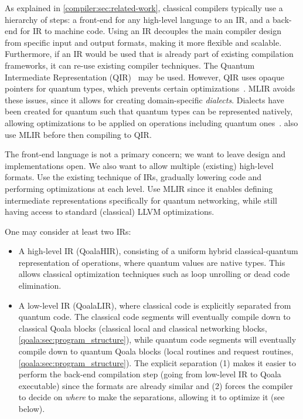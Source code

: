 As explained in \cref{compiler:sec:related-work}, classical compilers typically use a hierarchy of steps: a front-end for any high-level language to an \acf{IR}, and a back-end for \ac{IR} to machine code.
Using an \ac{IR} decouples the main compiler design from specific input and output formats, making it more flexible and scalable.
Furthermore, if an \ac{IR} would be used that is already part of existing compilation frameworks, it can re-use existing compiler techniques.
The Quantum Intermediate Representation (QIR)~\cite{haner_software_2018, geller_introducing_2020} may be used.
However, QIR uses opaque pointers for quantum types, which prevents certain optimizations~\cite{ittah_enabling_2022, peduri_qssa_2022}.
\acf{MLIR} avoids these issues, since it allows for creating domain-specific \emph{dialects}.
Dialects have been created for quantum such that quantum types can be represented natively, allowing optimizations to be applied on operations including quantum ones~\cite{ittah_enabling_2022, peduri_qssa_2022}.
\cite{mccaskey_mlir_2021, nguyen_retargetable_2022} also use \ac{MLIR} before then compiling to QIR.


The front-end language is not a primary concern; we want to leave design and implementations open.
We also want to allow multiple (existing) high-level formats.
Use the existing technique of IRs, gradually lowering code and performing optimizations at each level.
Use \ac{MLIR} since it enables defining intermediate representations specifically for quantum networking, while still having access to standard (classical) LLVM optimizations.

One may consider at least two \ac{IR}s:
\begin{itemize}
  \item A high-level \ac{IR} (QoalaHIR), consisting of a uniform hybrid classical-quantum representation of operations, where quantum values are native types.
  This allows classical optimization techniques such as loop unrolling or dead code elimination.
  \item A low-level \ac{IR} (QoalaLIR), where classical code is explicitly separated from quantum code.
  The classical code segments will eventually compile down to classical Qoala blocks (classical local and classical networking blocks, \cref{qoala:sec:program_structure}), while quantum code segments will eventually compile down to quantum Qoala blocks (local routines and request routines, \cref{qoala:sec:program_structure}).
  The explicit separation (1) makes it easier to perform the back-end compilation step (going from low-level IR to Qoala executable) since the formats are already similar and (2) forces the compiler to decide on \emph{where} to make the separations, allowing it to optimize it (see below).
\end{itemize}

